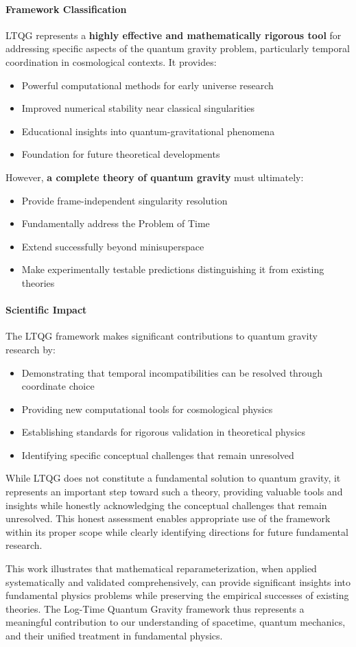 \paragraph{Framework Classification}
LTQG represents a \textbf{highly effective and mathematically rigorous tool} for addressing specific aspects of the quantum gravity problem, particularly temporal coordination in cosmological contexts. It provides:
\begin{itemize}
\item Powerful computational methods for early universe research
\item Improved numerical stability near classical singularities
\item Educational insights into quantum-gravitational phenomena
\item Foundation for future theoretical developments
\end{itemize}

However, \textbf{a complete theory of quantum gravity} must ultimately:
\begin{itemize}
\item Provide frame-independent singularity resolution
\item Fundamentally address the Problem of Time
\item Extend successfully beyond minisuperspace
\item Make experimentally testable predictions distinguishing it from existing theories
\end{itemize}

\paragraph{Scientific Impact}
The LTQG framework makes significant contributions to quantum gravity research by:
\begin{itemize}
\item Demonstrating that temporal incompatibilities can be resolved through coordinate choice
\item Providing new computational tools for cosmological physics
\item Establishing standards for rigorous validation in theoretical physics
\item Identifying specific conceptual challenges that remain unresolved
\end{itemize}

While LTQG does not constitute a fundamental solution to quantum gravity, it represents an important step toward such a theory, providing valuable tools and insights while honestly acknowledging the conceptual challenges that remain unresolved. This honest assessment enables appropriate use of the framework within its proper scope while clearly identifying directions for future fundamental research.

This work illustrates that mathematical reparameterization, when applied systematically and validated comprehensively, can provide significant insights into fundamental physics problems while preserving the empirical successes of existing theories. The Log-Time Quantum Gravity framework thus represents a meaningful contribution to our understanding of spacetime, quantum mechanics, and their unified treatment in fundamental physics.